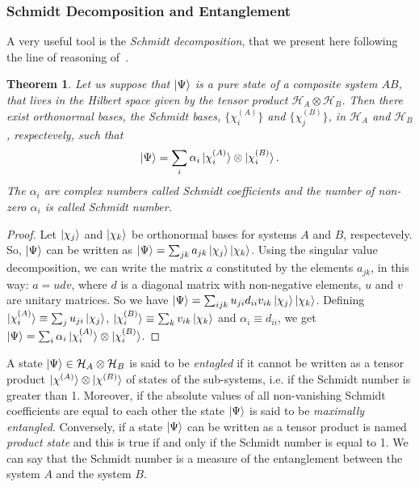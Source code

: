 \subsubsection{Schmidt Decomposition and Entanglement}
A very useful tool is the \emph{Schmidt decomposition}, that we present here following the line of reasoning of~\cite{nielsen_chuang}.
\newtheorem{theo}{Theorem}[section]
\begin{theo}
    Let us suppose that $\ket{\Psi}$ is a pure state of a composite system $AB$, that lives in the Hilbert space given by the tensor product $\mathcal{H}_A \otimes \mathcal{H}_B$. Then there exist orthonormal bases, the Schmidt bases, $\{\chi_i^{(A)}\}$ and $\{\chi_j^{(B)}\}$, in $\mathcal{H}_A$ and $\mathcal{H}_B$, respectevely, such that
    \begin{equation}
        \ket{\Psi} = \sum_i \alpha_i \ket{\chi_i^{(A)}}\otimes \ket{\chi_i^{(B)}}.
    \end{equation}
    The $\alpha_i$ are complex numbers called Schmidt coefficients and the number of non-zero $\alpha_i$ is called Schmidt number.
\end{theo}
\begin{proof}
Let $\ket{\chi_j}$ and $\ket{\chi_k}$ be orthonormal bases for systems $A$ and $B$, respectevely. So, $\ket{\Psi}$ can be written as $\ket{\Psi} = \sum_{jk} a_{jk}\ket{\chi_j}\ket{\chi_k}$. Using the singular value decomposition, we can write the matrix $a$ constituted by the elements $a_{jk}$, in this way: $a = udv$, where $d$ is a diagonal matrix with non-negative elements, $u$ and $v$ are unitary matrices. So we have $\ket{\Psi} = \sum_{ijk} u_{ji}d_{ii}v_{ik} \ket{\chi_j}\ket{\chi_k}$.
Defining $\ket{\chi_i^{(A)}} \equiv \sum_j u_{ji}\ket{\chi_j}$, $\ket{\chi_i^{(B)}} \equiv \sum_k v_{ik}\ket{\chi_k}$ and $\alpha_i \equiv d_{ii}$, we get $\ket{\Psi} = \sum_i \alpha_i \ket{\chi_i^{(A)}}\otimes \ket{\chi_i^{(B)}}$.
\end{proof}

A state $\ket{\Psi} \in \mathcal{H}_A \otimes \mathcal{H}_B$ is said to be \emph{entagled} if it cannot be written as a tensor product $\ket{\chi^{(A)}}\otimes \ket{\chi^{(B)}}$ of states of the sub-systems, i.e. if the Schmidt number is greater than 1. Moreover, if the absolute values of all non-vanishing Schmidt coefficients are equal to each other the state $\ket{\Psi}$ is said to be \emph{maximally entangled}. Conversely, if a state $\ket{\Psi}$ can be written as a tensor product is named \emph{product state} and this is true if and only if the Schmidt number is equal to 1. We can say that the Schmidt number is a measure of the entanglement between the system $A$ and the system $B$.

